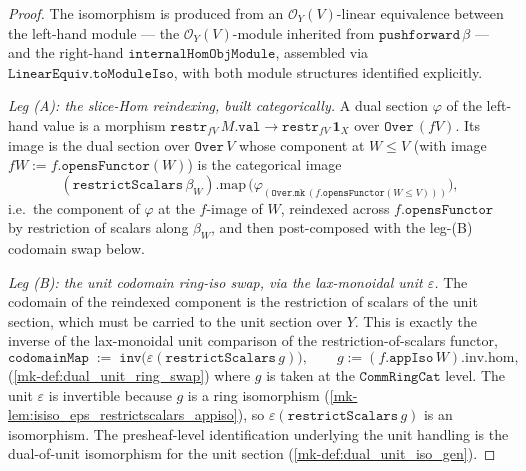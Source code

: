 \begin{proof}
  \leanok
  The isomorphism is produced from an \(\mathcal{O}_Y(V)\)-linear equivalence between the
  left-hand module --- the \(\mathcal{O}_Y(V)\)-module inherited from
  \(\mathtt{pushforward}\,\beta\) --- and the right-hand \(\mathtt{internalHomObjModule}\),
  assembled via \(\mathtt{LinearEquiv.toModuleIso}\), with both module structures
  identified explicitly.

  \emph{Leg (A): the slice-Hom reindexing, built categorically.} A dual section
  \(\varphi\) of the left-hand value is a morphism \(\mathtt{restr}_{fV}\,M.\mathtt{val} \to
  \mathtt{restr}_{fV}\,\mathbf{1}_X\) over \(\mathtt{Over}\,(fV)\). Its image is the dual
  section over \(\mathtt{Over}\,V\) whose component at \(W \le V\) (with image
  \(fW := f.\mathtt{opensFunctor}(W)\)) is the categorical image
  \[
    (\mathtt{restrictScalars}\,\beta_W).\mathrm{map}\,
      \bigl(\varphi_{(\mathtt{Over.mk}\,(f.\mathtt{opensFunctor}(W \le V)))}\bigr),
  \]
  i.e.\ the component of \(\varphi\) at the \(f\)-image of \(W\), reindexed across
  \(f.\mathtt{opensFunctor}\) by restriction of scalars along \(\beta_W\), and then
  post-composed with the leg-(B) codomain swap below.

  \emph{Leg (B): the unit codomain ring-iso swap, via the lax-monoidal unit \(\varepsilon\).}
  The codomain of the reindexed component is the restriction of scalars of the unit section,
  which must be carried to the unit section over \(Y\). This is exactly the inverse of the
  lax-monoidal unit comparison of the restriction-of-scalars functor,
  \[
    \mathtt{codomainMap} \;:=\;
      \mathtt{inv}\bigl(\varepsilon(\mathtt{restrictScalars}\,g)\bigr),
      \qquad g := (f.\mathtt{appIso}\,W).\mathrm{inv}.\mathrm{hom},
  \]
  (\ref{mk-def:dual_unit_ring_swap})
  where \(g\) is taken at the \emph{\(\mathtt{CommRingCat}\)} level. The unit \(\varepsilon\)
  is invertible because \(g\) is a ring isomorphism
  (\ref{mk-lem:isiso_eps_restrictscalars_appiso}),
  so \(\varepsilon(\mathtt{restrictScalars}\,g)\) is an isomorphism. The presheaf-level
  identification underlying the unit handling is the dual-of-unit isomorphism for the unit
  section (\ref{mk-def:dual_unit_iso_gen}).


\end{proof}

